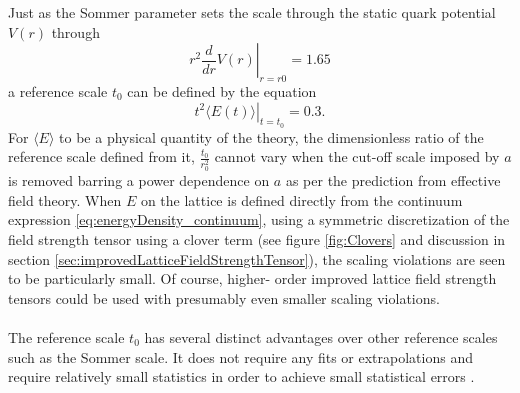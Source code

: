 \documentclass[a4paper,10pt]{book}
\begin{document}
Just as the Sommer parameter sets the scale through the static quark potential $V(r)$ through
\begin{equation}
r^2\left.\frac{d}{d r} V(r)\right|_{r=r0} = 1.65
\end{equation}
a reference scale $t_0$ can be defined by the equation
\begin{equation}\label{eq:t0RefImplicitEq}
\left.t^{2}\langle E(t)\rangle\right|_{t=t_{0}}=0.3.
\end{equation}
For $\langle E\rangle$ to be a physical quantity of the theory, the dimensionless ratio of the reference scale defined from it, $\frac{t_0}{r_0^2}$ cannot vary when the cut-off scale imposed by $a$ is removed barring a power dependence on $a$ as per the prediction from effective field theory. When $E$ on the lattice is defined directly from the continuum expression \eqref{eq:energyDensity_continuum}, using a symmetric discretization of the field strength tensor using a clover term (see figure \ref{fig:Clovers} and discussion in section \ref{sec:improvedLatticeFieldStrengthTensor}), the scaling violations are seen to be particularly small. Of course, higher- order improved lattice field strength tensors could be used with presumably even smaller scaling violations.\\\\
The reference scale $t_0$ has several distinct advantages over other reference scales such as the Sommer scale. It does not require any fits or extrapolations and require relatively small statistics in order to achieve small statistical errors \cite{Luscher2010}.
\end{document}
